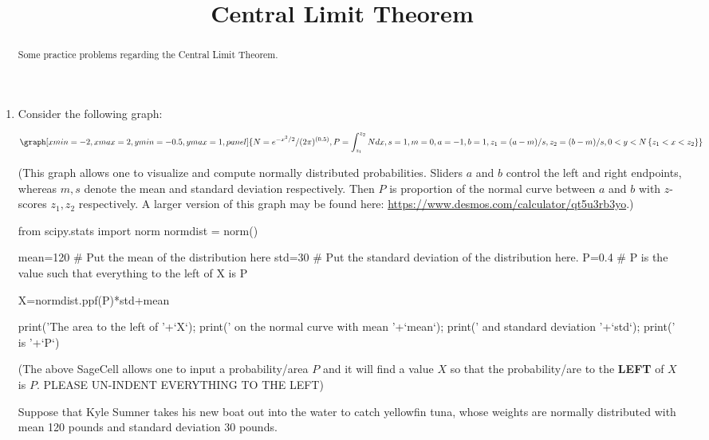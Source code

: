 \documentclass{ximera}
\title{Central Limit Theorem}
\begin{document}
    
 \begin{abstract}
 Some practice problems regarding the Central Limit Theorem.
 \end{abstract}   
    
      
      
\maketitle
      
 
\begin{enumerate}

\item Consider the following graph:

\begin{onlineOnly}
$$\graph[xmin=-2,xmax=2,ymin=-0.5,ymax=1, panel]{N=e^{-x^2/2}/(2\pi)^{(0.5)}, P=\int_{z_1}^{z_2} N dx, s=1, m=0, a=-1, b=1, z_1=(a-m)/s, z_2=(b-m)/s, 0<y<N\left\{z_1<x<z_2\right\}}$$
\end{onlineOnly}
(This graph allows one to visualize and compute normally distributed probabilities.  Sliders $a$ and $b$ control the left and right endpoints, whereas $m, s$ denote the mean and standard deviation respectively.  Then $P$ is proportion of the normal curve between $a$ and $b$ with $z$-scores $z_1, z_2$ respectively.  A larger version of this graph may be found here: \url{https://www.desmos.com/calculator/qt5u3rb3yo}.)


\begin{sageCell}
from scipy.stats import norm
normdist = norm()

mean=120 # Put the mean of the distribution here
std=30  # Put the standard deviation of the distribution here.
P=0.4  # P is the value such that everything to the left of X is P



X=normdist.ppf(P)*std+mean

print('The area to the left of '+`X`); print(' on the normal curve with mean '+`mean`); print(' and standard deviation '+`std`); print(' is  '+`P`)
\end{sageCell}
(The above SageCell allows one to input a probability/area $P$ and it will find a value $X$ so that the probability/are to the \textbf{LEFT} of $X$ is $P$.  PLEASE UN-INDENT EVERYTHING TO THE LEFT)



\begin{problem}
Suppose that Kyle Sumner takes his new boat out into the water to catch yellowfin tuna, whose weights are normally distributed with mean 120 pounds and standard deviation 30 pounds.  


\end{problem}
\end{enumerate}
\end{document}
